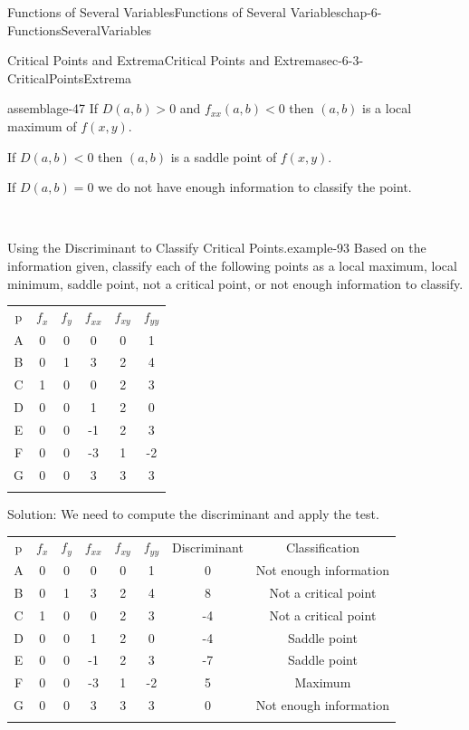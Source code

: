 \documentclass[oneside,10pt,]{book}
\numberwithin{equation}{section}
\newcommand{\hrulethin}  {\noalign{\hrule height 0.04em}}
\newcommand{\hrulethick} {\noalign{\hrule height 0.11em}}
\newcommand{\lt}{<}
\begin{document}
\begin{chapterptx}{Functions of Several Variables}{}{Functions of Several Variables}{}{}{chap-6-FunctionsSeveralVariables}
\begin{sectionptx}{Critical Points and Extrema}{}{Critical Points and Extrema}{}{}{sec-6-3-CriticalPointsExtrema}
\begin{assemblage}{}{assemblage-47}
\hypertarget{p-2368}{}%
If \(D(a,b)>0 \) and \(f_{xx} (a,b)\lt 0\) then \((a,b)\) is a local maximum of \(f(x,y)\).%
\par
\hypertarget{p-2369}{}%
If \(D(a,b)\lt 0\) then \((a,b)\) is a saddle point of \(f(x,y)\).%
\par
\hypertarget{p-2370}{}%
If \(D(a,b)=0\) we do not have enough information to classify the point.%
\end{assemblage}
   \begin{example}{Using the Discriminant to Classify Critical Points.}{example-93}%
\hypertarget{p-2371}{}%
Based on the information given, classify each of the following points as a local maximum, local minimum, saddle point, not a critical point, or not enough information to classify.%
\begin{sidebyside}{1}{0}{0}{0}%
\begin{sbspanel}{1}%
{\centering%
\begin{tabular}{cccccc}\hrulethick
p&\({f_x}\)&\({f_y}\)&\(f_{xx}\)&\(f_{xy}\)&\(f_{yy}\)\tabularnewline\hrulethin
A&0&0&0&0&1\tabularnewline\hrulethin
B&0&1&3&2&4\tabularnewline\hrulethin
C&1&0&0&2&3\tabularnewline\hrulethin
D&0&0&1&2&0\tabularnewline\hrulethin
E&0&0&-1&2&3\tabularnewline\hrulethin
F&0&0&-3&1&-2\tabularnewline\hrulethin
G&0&0&3&3&3\tabularnewline\hrulethin
\end{tabular}
\par}
\end{sbspanel}%
\end{sidebyside}%
\par
\hypertarget{p-2372}{}%
Solution:  We need to compute the discriminant and apply the test.%
\begin{sidebyside}{1}{0}{0}{0}%
\begin{sbspanel}{1}%
{\centering%
\begin{tabular}{cccccccc}\hrulethick
p&\(f_x\)&\(f_y\)&\(f_{xx}\)&\(f_{xy}\)&\(f_{yy}\)&Discriminant&Classification\tabularnewline\hrulethin
A&0&0&0&0&1&0&Not enough information\tabularnewline\hrulethin
B&0&1&3&2&4&8&Not a critical point\tabularnewline\hrulethin
C&1&0&0&2&3&-4&Not a critical point\tabularnewline\hrulethin
D&0&0&1&2&0&-4&Saddle point\tabularnewline\hrulethin
E&0&0&-1&2&3&-7&Saddle point\tabularnewline\hrulethin
F&0&0&-3&1&-2&5&Maximum\tabularnewline\hrulethin
G&0&0&3&3&3&0&Not enough information\tabularnewline\hrulethin
\end{tabular}
\par}
\end{sbspanel}%
\end{sidebyside}%

\end{example}
\end{sectionptx}
\end{chapterptx}
\end{document}
